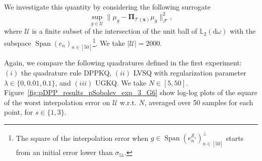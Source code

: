 \documentclass[twoside,11pt]{book}
\numberwithin{theorem}{chapter}
\numberwithin{definition}{chapter}
\numberwithin{proposition}{chapter}
\numberwithin{corollary}{chapter}
\numberwithin{example}{chapter}
\numberwithin{lemma}{chapter}
\numberwithin{assumption}{chapter}
\numberwithin{equation}{chapter}
\numberwithin{figure}{chapter}
\DeclareMathOperator{\Span}{\mathrm{Span}}
\begin{document}
We investigate this quantity by considering the following surrogate
\begin{equation}\label{eq:surrogate_worst_inerpolation_error}
\sup\limits_{g \in \mathcal{U}} \|\mu_{g}-\bm{\Pi}_{\mathcal{T}(\bm{x})} \mu_{g}\|_{\mathcal{F}}^{2},
\end{equation}
where $\mathcal{U}$ is a finite subset of the intersection of the unit ball of $\mathbb{L}_{2}(\mathrm{d}\omega)$ with the subspace $\Span(e_{n})_{n \in [50]}$\footnote{The square of the interpolation error when $g \in \Span(e_{n}^{\mathcal{S}_{s}})_{n \in [50]}^{\perp}$ starts from an initial error lower than $\sigma_{51}$.}. We take $|\mathcal{U}| = 2000$.

Again, we compare the following quadratures defined in the first experiment: $(i)$ the quadrature rule DPPKQ, $(ii)$ LVSQ with regularization parameter $\lambda \in \{ 0, 0.01,0.1 \}$, and $(iii)$ UGKQ. We take $N \in [5,50]$. Figure~\ref{fig:pDPP_results_pSobolev_exp_3_G6} show log-log plots of the square of the worst interpolation error on $\mathcal{U}$ w.r.t. $N$, averaged over 50 samples for each point, for $s \in \{1,3\}$.  
\end{document}

